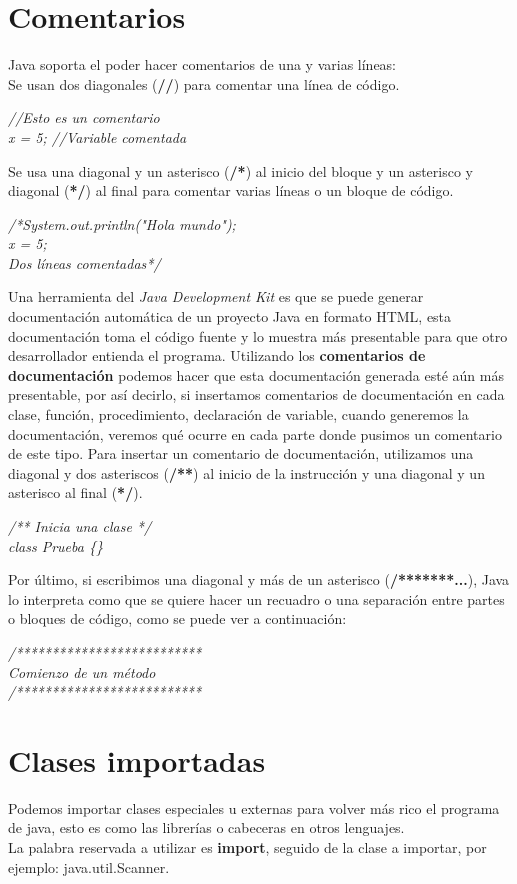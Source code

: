 \section{Comentarios}
Java soporta el poder hacer comentarios de una y varias líneas:\\
Se usan dos diagonales (\textbf{//}) para comentar una línea de código.\begin{center}\textit{//Esto es un comentario\\x = 5; //Variable comentada}\end{center}
Se usa una diagonal y un asterisco (\textbf{/*}) al inicio del bloque y un asterisco y diagonal (\textbf{*/}) al final para comentar varias líneas o un bloque de código.
\begin{center}\textit{/*System.out.println("Hola mundo");\\x = 5;\\Dos líneas comentadas*/}\end{center}
Una herramienta del \textit{Java Development Kit} es que se puede generar documentación automática de un proyecto Java en formato HTML, esta documentación toma el código fuente y lo muestra más presentable para que otro desarrollador entienda el programa. Utilizando los \textbf{comentarios de documentación} podemos hacer que esta documentación generada esté aún más presentable, por así decirlo, si insertamos comentarios de documentación en cada clase, función, procedimiento, declaración de variable, cuando generemos la documentación, veremos qué ocurre en cada parte donde pusimos un comentario de este tipo. Para insertar un comentario de documentación, utilizamos una diagonal y dos asteriscos (\textbf{/**}) al inicio de la instrucción y una diagonal y un asterisco al final (\textbf{*/}). \begin{center}\textit{/** Inicia una clase */\\class Prueba \{\}}\end{center}
Por último, si escribimos una diagonal y más de un asterisco (\textbf{/*******...}), Java lo interpreta como que se quiere hacer un recuadro o una separación entre partes o bloques de código, como se puede ver a continuación:\begin{center}\textit{/**************************\\Comienzo de un método\\/**************************}\end{center}



\section{Clases importadas}
Podemos importar clases especiales u externas para volver más rico el programa de java, esto es como las librerías o cabeceras en otros lenguajes.\\
La palabra reservada a utilizar es \textbf{import}, seguido de la clase a importar, por ejemplo: java.util.Scanner.



